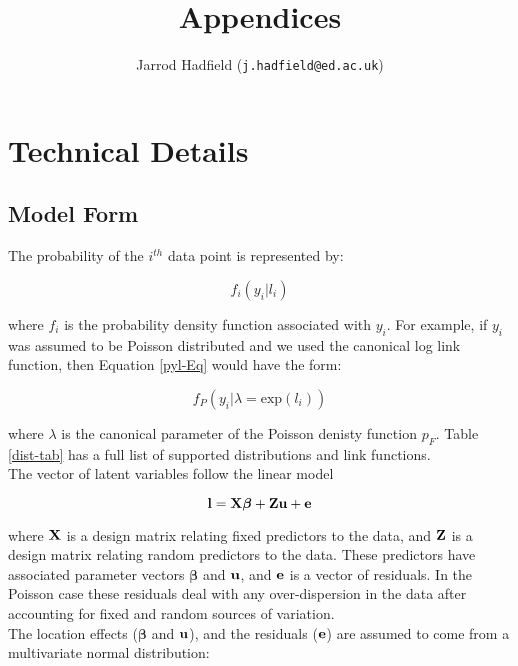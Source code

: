 \documentclass{article}
\title{Appendices}
\author{Jarrod Hadfield (\texttt{j.hadfield@ed.ac.uk})}
\begin{document}
\maketitle
\else
\chapter{Technical Details}
\label{chap7}
\fi




\section{Model Form}
The probability of the $i^{th}$ data point is represented by:

\begin{equation}
f_{i}(y_{i} | l_{i})
\label{pyl-Eq}
\end{equation}

where $f_{i}$ is the probability density function associated with $y_{i}$. For example, if $y_{i}$ was assumed to be Poisson distributed and we used the canonical log link function, then Equation \ref{pyl-Eq} would have the form:

\begin{equation}
f_{P}\left(y_{i} | \lambda = \textrm{exp}(l_{i})\right)
\label{pyl2-Eq}
\end{equation}

where $\lambda$ is the canonical parameter of the Poisson denisty function $p_{F}$. Table \ref{dist-tab} has a full list of supported distributions and link functions.\\

The vector of latent variables follow the linear model

\begin{equation}
{\bf l}  = {\bf X}{\bm \beta}+{\bf Z}{\bf u}+{\bf e}
\label{l-Eq}
\end{equation}
 
where ${\bf X}$ is a design matrix relating fixed predictors to the data, and ${\bf Z}$ is a design matrix relating random predictors to the data.  These predictors have associated parameter vectors ${\bm \beta}$ and ${\bf u}$, and ${\bf e}$ is a vector of residuals.  In the Poisson case these residuals deal with any over-dispersion in the data after accounting for fixed and random sources of variation.\\

The location effects (${\bm \beta}$ and ${\bf u}$), and the residuals (${\bf e}$) are assumed to come from a multivariate normal distribution:
\end{document}
